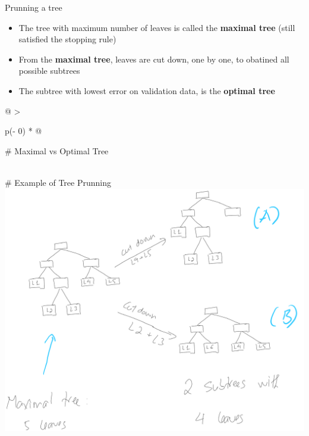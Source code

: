 \documentclass[
  ignorenonframetext,
]{beamer}
\providecommand{\tightlist}{%
  \setlength{\itemsep}{0pt}\setlength{\parskip}{0pt}}
\begin{document}
\begin{frame}{Prunning a tree}
\protect\hypertarget{prunning-a-tree}{}
\begin{itemize}
\tightlist
\item
  The tree with maximum number of leaves is called the \textbf{maximal
  tree} (still satisfied the stopping rule)
\item
  From the \textbf{maximal tree}, leaves are cut down, one by one, to
  obatined all possible subtrees
\item
  The subtree with lowest error on validation data, is the
  \textbf{optimal tree}
\end{itemize}

\begin{longtable}[]{@{}
  >{\raggedright\arraybackslash}p{(\columnwidth - 0\tabcolsep) * }@{}}
\toprule
\begin{minipage}[b]{\linewidth}\raggedright
\# Maximal vs Optimal Tree
\end{minipage} \\
\midrule
\endhead
\# Example of Tree Prunning \\
\includegraphics{images/tree8.png} \\
\bottomrule
\end{longtable}
\end{frame}
\end{document}
